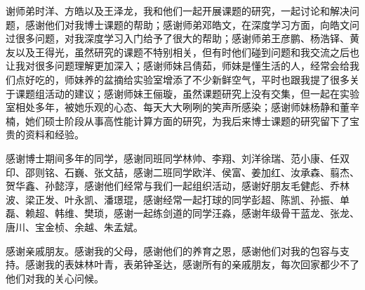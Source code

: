 \begin{ack}
谢师弟时洋、方皓以及王泽龙，我和他们一起开展课题的研究，一起讨论和解决问题，感谢他们对我博士课题的帮助；感谢师弟邓皓文，在深度学习方面，向皓文问过很多问题，对我深度学习入门给予了很大的帮助；感谢师弟王彦鹏、杨浩铎、黄友以及王得光，虽然研究的课题不特别相关，但有时他们碰到问题和我交流之后也让我对很多问题理解更加深入；感谢师妹吕倩茹，师妹是懂生活的人，经常会给我们点好吃的，师妹养的盆摘给实验室增添了不少新鲜空气，平时也跟我提了很多关于课题组活动的建议；感谢师妹王俪璇，虽然课题研究上没有交集，但一起在实验室相处多年，被她乐观的心态、每天大大咧咧的笑声所感染；感谢师妹杨静和董辛楠，她们硕士阶段从事高性能计算方面的研究，为我后来博士课题的研究留下了宝贵的资料和经验。

感谢博士期间多年的同学，感谢同班同学林帅、李翔、刘洋徐瑞、范小康、任双印、邵则铭、石巍、张文喆，感谢二班同学欧洋、侯富、姜加红、汝承森、翦杰、贺华鑫、孙懿淳，感谢他们经常与我们一起组织活动，感谢好朋友毛健彪、乔林波、梁正发、叶永凯、潘璟琨，感谢经常一起打球的同学彭超、陈凯、孙振、单磊、赖超、韩维、樊琐，感谢一起练剑道的同学汪淼，感谢年级骨干蓝龙、张龙、唐川、宝金桢、余越、朱孟斌。

感谢亲戚朋友。感谢我的父母，感谢他们的养育之恩，感谢他们对我的包容与支持。感谢我的表妹林叶青，表弟钟圣达，感谢所有的亲戚朋友，每次回家都少不了他们对我的关心问候。


\end{ack}
